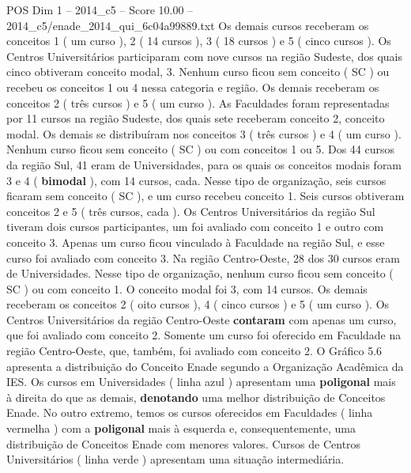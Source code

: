 \begin{textsample}{POS Dim 1 – 2014\_c5 – Score 10.00 – 2014\_c5/enade\_2014\_qui\_6c04a99889.txt}
Os demais cursos receberam os conceitos 1 ( um curso ), 2 ( 14 cursos ), 3 ( 18 cursos ) e 5 ( cinco cursos ).
Os Centros Universitários participaram com nove cursos na região Sudeste, dos quais cinco obtiveram conceito modal, 3.
Nenhum curso ficou sem conceito ( SC ) ou recebeu os conceitos 1 ou 4 nessa categoria e região.
Os demais receberam os conceitos 2 ( três cursos ) e 5 ( um curso ).
As Faculdades foram representadas por 11 cursos na região Sudeste, dos quais sete receberam conceito 2, conceito modal.
Os demais se distribuíram nos conceitos 3 ( três cursos ) e 4 ( um curso ).
Nenhum curso ficou sem conceito ( SC ) ou com conceitos 1 ou 5.
Dos 44 cursos da região Sul, 41 eram de Universidades, para os quais os conceitos modais foram 3 e 4 ( \textbf{bimodal} ), com 14 cursos, cada.
Nesse tipo de organização, seis cursos ficaram sem conceito ( SC ), e um curso recebeu conceito 1.
Seis cursos obtiveram conceitos 2 e 5 ( três cursos, cada ).
Os Centros Universitários da região Sul tiveram dois cursos participantes, um foi avaliado com conceito 1 e outro com conceito 3.
Apenas um curso ficou vinculado à Faculdade na região Sul, e esse curso foi avaliado com conceito 3.
Na região Centro-Oeste, 28 dos 30 cursos eram de Universidades.
Nesse tipo de organização, nenhum curso ficou sem conceito ( SC ) ou com conceito 1.
O conceito modal foi 3, com 14 cursos.
Os demais receberam os conceitos 2 ( oito cursos ), 4 ( cinco cursos ) e 5 ( um curso ).
Os Centros Universitários da região Centro-Oeste \textbf{contaram} com apenas um curso, que foi avaliado com conceito 2.
Somente um curso foi oferecido em Faculdade na região Centro-Oeste, que, também, foi avaliado com conceito 2.
O Gráfico 5.6 apresenta a distribuição do Conceito Enade segundo a Organização Acadêmica da IES.
Os cursos em Universidades ( linha azul ) apresentam uma \textbf{poligonal} mais à direita do que as demais, \textbf{denotando} uma melhor distribuição de Conceitos Enade.
No outro extremo, temos os cursos oferecidos em Faculdades ( linha vermelha ) com a \textbf{poligonal} mais à esquerda e, consequentemente, uma distribuição de Conceitos Enade com menores valores.
Cursos de Centros Universitários ( linha verde ) apresentam uma situação intermediária.

\end{textsample}
